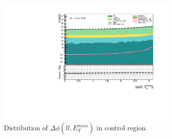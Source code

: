 \documentclass[14pt, a4paper]{book}
\begin{document}
\begin{figure}[!ht]
    \centering
        \includegraphics[width=0.8\textwidth]{dPhiLLMET.pdf}
    \caption{Distribution of $\Delta\phi(ll,E_T^{miss})$ in control region.}\label{fig:dPhiLLMET_dist}
\end{figure}
\end{document}
